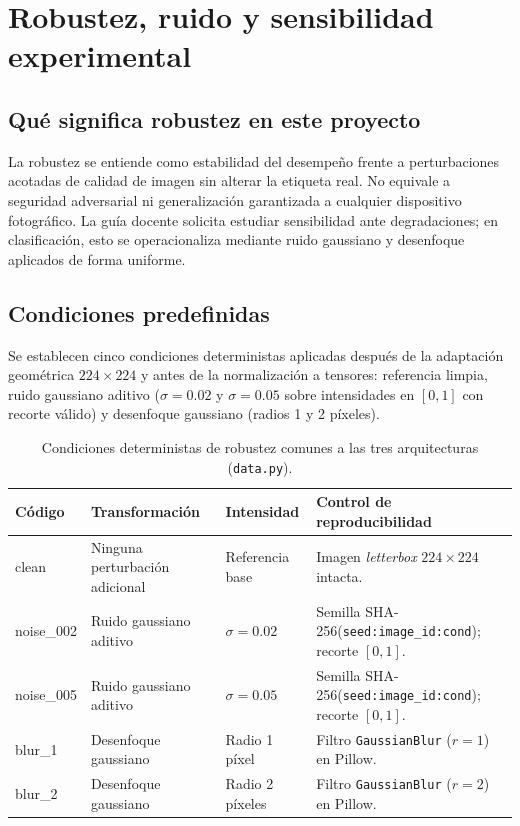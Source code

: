 \FloatBarrier\section{Robustez, ruido y sensibilidad experimental}

\subsection{Qué significa robustez en este proyecto}
La robustez se entiende como estabilidad del desempeño frente a perturbaciones acotadas de calidad de imagen sin alterar la etiqueta real. No equivale a seguridad adversarial ni generalización garantizada a cualquier dispositivo fotográfico. La guía docente solicita estudiar sensibilidad ante degradaciones; en clasificación, esto se operacionaliza mediante ruido gaussiano y desenfoque aplicados de forma uniforme.

\subsection{Condiciones predefinidas}
Se establecen cinco condiciones deterministas aplicadas después de la adaptación geométrica $224\times224$ y antes de la normalización a tensores: referencia limpia, ruido gaussiano aditivo ($\sigma=0.02$ y $\sigma=0.05$ sobre intensidades en $[0,1]$ con recorte válido) y desenfoque gaussiano (radios 1 y 2 píxeles).

\begin{table}[htbp]\centering\small
\caption{Condiciones deterministas de robustez comunes a las tres arquitecturas (\texttt{data.py}).}
\begin{tabularx}{\textwidth}{@{}>{\ttfamily}p{2.4cm}p{4.3cm}p{2.9cm}>{\raggedright\arraybackslash}X@{}}
\toprule
\textbf{\textrm{Código}} & \textbf{Transformación} & \textbf{Intensidad} & \textbf{Control de reproducibilidad} \\ \midrule
clean & Ninguna perturbación adicional & Referencia base & Imagen \textit{letterbox} $224\times224$ intacta. \\
noise\_002 & Ruido gaussiano aditivo & $\sigma=0.02$ & Semilla SHA-256(\texttt{seed:image\_id:cond}); recorte $[0,1]$. \\
noise\_005 & Ruido gaussiano aditivo & $\sigma=0.05$ & Semilla SHA-256(\texttt{seed:image\_id:cond}); recorte $[0,1]$. \\
blur\_1 & Desenfoque gaussiano & Radio 1 píxel & Filtro \texttt{GaussianBlur} ($r=1$) en Pillow. \\
blur\_2 & Desenfoque gaussiano & Radio 2 píxeles & Filtro \texttt{GaussianBlur} ($r=2$) en Pillow. \\
\bottomrule
\end{tabularx}
\end{table}

